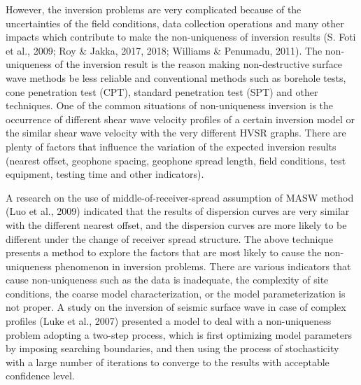  However, the inversion problems are very complicated because of the uncertainties of the field conditions, data collection operations and many other impacts which contribute to make the non-uniqueness of inversion results (S. Foti et al., 2009; Roy \& Jakka, 2017, 2018; Williams \& Penumadu, 2011). The non-uniqueness of the inversion result is the reason making non-destructive surface wave methods be less reliable and conventional methods such as borehole tests, cone penetration test (CPT), standard penetration test (SPT) and other techniques. One of the common situations of non-uniqueness inversion is the occurrence of different shear wave velocity profiles of a certain inversion model or the similar shear wave velocity with the very different HVSR graphs. There are plenty of factors that influence the variation of the expected inversion results (nearest offset, geophone spacing, geophone spread length, field conditions, test equipment, testing time and other indicators).
 
A research on the use of middle-of-receiver-spread assumption of MASW method (Luo et al., 2009) indicated that the results of dispersion curves are very similar with the different nearest offset, and the dispersion curves are more likely to be different under the change of receiver spread structure. The above technique presents a method to explore the factors that are most likely to cause the non-uniqueness phenomenon in inversion problems. There are various indicators that cause non-uniqueness such as the data is inadequate, the complexity of site conditions, the coarse model characterization, or the model parameterization is not proper. A study on the inversion of seismic surface wave in case of complex profiles (Luke et al., 2007) presented a model to deal with a non-uniqueness problem adopting a two-step process, which is first optimizing model parameters by imposing searching boundaries, and then using the process of stochasticity with a large number of iterations to converge to the results with acceptable confidence level. 

